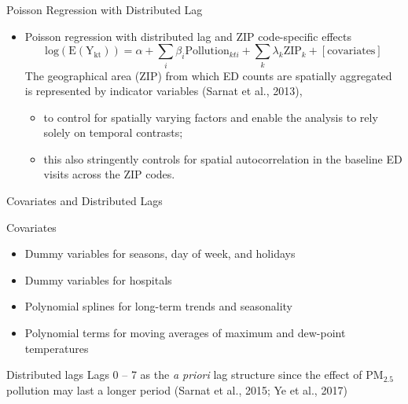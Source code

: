 \documentclass{beamer}
\begin{document}
\begin{frame}{Poisson Regression with Distributed Lag}
    \begin{itemize}
        \item Poisson regression with distributed lag and ZIP code-specific effects
            \begin{equation*}
                \mathrm{log(E(Y_{kt}))}=\alpha+\sum_i\beta_i\mathrm{Pollution}_{kti}+\sum_k\lambda_k\mathrm{ZIP}_k+[\mathrm{covariates}]
            \end{equation*}
        \textcolor[rgb]{0.1,0.1,0.6}{The geographical area (ZIP) from which ED counts are spatially aggregated is represented by indicator variables  (Sarnat et al., 2013),}
            \begin{itemize}
                \item \textcolor[rgb]{0.1,0.1,0.6}{to control for spatially varying factors and enable the analysis to rely solely on temporal contrasts;}
                \item \textcolor[rgb]{0.1,0.1,0.6}{this also stringently controls for spatial autocorrelation in the baseline ED visits across the ZIP codes.}
            \end{itemize}
    \end{itemize}
\end{frame}

\begin{frame}{Covariates and Distributed Lags}
    \begin{block}{Covariates}
        \begin{itemize}
            \item Dummy variables for seasons, day of week, and holidays
            \item Dummy variables for hospitals
            \item Polynomial splines for long-term trends and seasonality
            \item Polynomial terms for moving averages of maximum and dew-point temperatures
        \end{itemize}
    \end{block}
    \begin{block}{Distributed lags}
        Lags 0 -- 7 as the \textit{a priori} lag structure since the effect of PM$_{2.5}$ pollution may last a longer period (Sarnat et al., 2015; Ye et al., 2017)
    \end{block}
\end{frame}
\end{document}
